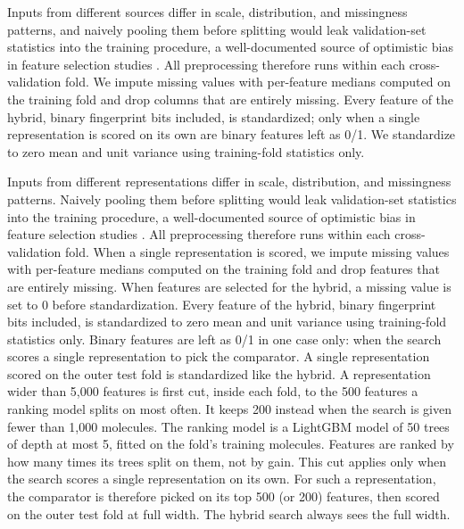 Inputs from different sources differ in scale, distribution, and missingness patterns, and naively pooling them before splitting would leak validation-set statistics into the training procedure, a well-documented source of optimistic bias in feature selection studies \citep{Ambroise2002, Vabalas2019}. All preprocessing therefore runs within each cross-validation fold. We impute missing values with per-feature medians computed on the training fold and drop columns that are entirely missing. Every feature of the hybrid, binary fingerprint bits included, is standardized; only when a single representation is scored on its own are binary features left as 0/1. We standardize to zero mean and unit variance using training-fold statistics only.

Inputs from different representations differ in scale, distribution, and missingness patterns. Naively pooling them before splitting would leak validation-set statistics into the training procedure, a well-documented source of optimistic bias in feature selection studies \citep{Ambroise2002, Vabalas2019}. All preprocessing therefore runs within each cross-validation fold. When a single representation is scored, we impute missing values with per-feature medians computed on the training fold and drop features that are entirely missing. When features are selected for the hybrid, a missing value is set to 0 before standardization. Every feature of the hybrid, binary fingerprint bits included, is standardized to zero mean and unit variance using training-fold statistics only. Binary features are left as 0/1 in one case only: when the search scores a single representation to pick the comparator. A single representation scored on the outer test fold is standardized like the hybrid. A representation wider than 5,000 features is first cut, inside each fold, to the 500 features a ranking model splits on most often. It keeps 200 instead when the search is given fewer than 1,000 molecules. The ranking model is a LightGBM model of 50 trees of depth at most 5, fitted on the fold's training molecules. Features are ranked by how many times its trees split on them, not by gain. This cut applies only when the search scores a single representation on its own. For such a representation, the comparator is therefore picked on its top 500 (or 200) features, then scored on the outer test fold at full width. The hybrid search always sees the full width.

